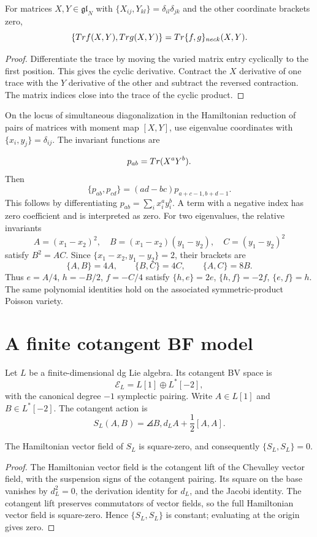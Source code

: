 \begin{theorem}
For matrices $X,Y\in\mathfrak{gl}_N$ with $\{X_{ij},Y_{kl}\}=\delta_{il}\delta_{jk}$ and the other coordinate brackets zero,
\[
 \{Tr f(X,Y),Tr g(X,Y)\}
 =Tr\{f,g\}_{neck}(X,Y).
\]
\end{theorem}
\begin{proof}
Differentiate the trace by moving the varied matrix entry cyclically to the first position. This gives the cyclic derivative. Contract the $X$ derivative of one trace with the $Y$ derivative of the other and subtract the reversed contraction. The matrix indices close into the trace of the cyclic product.
\end{proof}

On the locus of simultaneous diagonalization in the Hamiltonian reduction
of pairs of matrices with moment map $[X,Y]$, use eigenvalue coordinates
with $\{x_i,y_j\}=\delta_{ij}$. The invariant functions are

\[
 p_{ab}=Tr(X^aY^b).
\]
Then
\[
 \{p_{ab},p_{cd}\}=(ad-bc)p_{a+c-1,b+d-1}.
\]
This follows by differentiating $p_{ab}=\sum_i x_i^ay_i^b$. A term with a negative index has zero coefficient and is interpreted as zero.
For two eigenvalues, the relative invariants
\[
 A=(x_1-x_2)^2,
 \quad B=(x_1-x_2)(y_1-y_2),
 \quad C=(y_1-y_2)^2
\]
satisfy $B^2=AC$. Since $\{x_1-x_2,y_1-y_2\}=2$, their brackets are
\[
 \{A,B\}=4A,\qquad\{B,C\}=4C,\qquad\{A,C\}=8B.
\]
Thus $e=A/4$, $h=-B/2$, $f=-C/4$ satisfy
$\{h,e\}=2e$, $\{h,f\}=-2f$, $\{e,f\}=h$.
The same polynomial identities hold on the associated symmetric-product
Poisson variety.



\section{A finite cotangent BF model}
Let $L$ be a finite-dimensional dg Lie algebra. Its cotangent BV space is
\[
 \mathcal E_L=L[1]\oplus L^*[-2],
\]
with the canonical degree $-1$ symplectic pairing. Write $A\in L[1]$ and $B\in L^*[-2]$. The cotangent action is
\[
 S_L(A,B)=\angles{B,d_LA+\frac12[A,A]}.
\]

\begin{theorem}
The Hamiltonian vector field of $S_L$ is square-zero, and consequently $\{S_L,S_L\}=0$.
\end{theorem}
\begin{proof}
The Hamiltonian vector field is the cotangent lift of the Chevalley vector field, with the suspension signs of the cotangent pairing. Its square on the base vanishes by $d_L^2=0$, the derivation identity for $d_L$, and the Jacobi identity. The cotangent lift preserves commutators of vector fields, so the full Hamiltonian vector field is square-zero. Hence $\{S_L,S_L\}$ is constant; evaluating at the origin gives zero.
\end{proof}

